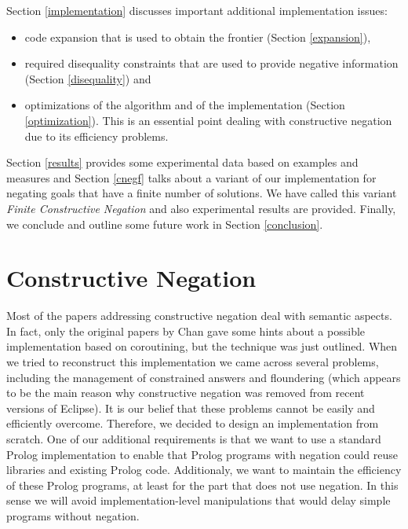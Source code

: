 \documentclass{tlp}
\begin{document}
Section \ref{implementation} discusses important additional implementation issues: 
\begin{itemize} 
      \item code expansion that is used to obtain the frontier (Section
\ref{expansion}),
      \item required disequality constraints that are used to provide negative
information (Section \ref{disequality}) and
      \item optimizations of the algorithm and of the implementation (Section
\ref{optimization}). This is an essential point dealing with constructive
negation due to its efficiency problems.
\end{itemize} 

Section \ref{results} provides some experimental data based on examples and
measures and Section \ref{cnegf} talks about a variant of our implementation
for negating goals that have a finite number of solutions. We have called this
variant \emph{Finite Constructive Negation} and also experimental results are
provided. Finally, we conclude and outline some future work in Section
\ref{conclusion}.
 


\section{Constructive Negation}
\label{constructive}

Most of the papers addressing constructive negation deal with semantic
aspects. In fact, only the original papers by Chan gave some hints
about a possible implementation based on coroutining, but the
technique was just outlined. When we tried to reconstruct this
implementation we came across several problems, including the
management of constrained answers and floundering (which appears to be
the main reason why constructive negation was removed from recent
versions of Eclipse). It is our belief that these problems cannot be
easily and efficiently overcome. Therefore, we decided to design an
implementation from scratch.  One of our additional requirements is
that we want to use a standard Prolog implementation to enable that
Prolog programs with negation could reuse libraries and existing
Prolog code. Additionaly, we want to maintain the efficiency of these
Prolog programs, at least for the part that does not use negation.  In
this sense we will avoid implementation-level manipulations that would
delay simple programs without negation.
\end{document}
